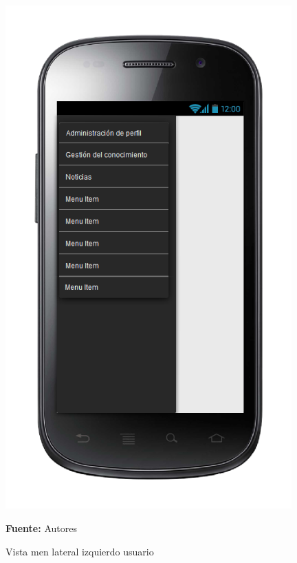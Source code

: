 \begin{figure}[!htb]
  \begin{center}
\includegraphics[width=11cm]{./imagenes/UI/Usuarios/menu_lateral_izquierdo_usuario.png}
    \caption{Vista men lateral izquierdo usuario}
    \label{fig:Vista_menu_lateral_izquierdo_usuario}
    \textbf{Fuente:}  Autores
  \end{center}
\end{figure}
